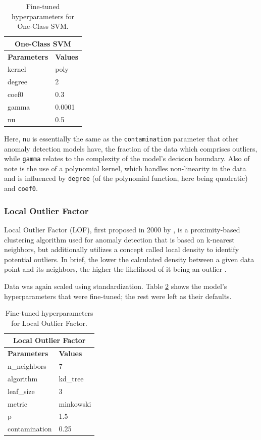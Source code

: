 \documentclass[12pt,a4paper]{article}
\numberwithin{figure}{section}
\numberwithin{table}{section}
\numberwithin{definition}{section}
\begin{document}
\begin{table}[!h] 
  \centering\small
  \renewcommand{\arraystretch}{1.5} 
  \begin{tabular}{@{}ll@{}}
  \hline
  \multicolumn{2}{|c|}{\textbf{One-Class SVM}} \\
  \hline
  \textbf{Parameters} & \textbf{Values} \\
  \hline
  kernel & poly \\
  degree & 2 \\
  coef0 & 0.3 \\
  gamma & 0.0001 \\
  nu & 0.5 \\
  \hline
  \end{tabular}
  \caption{Fine-tuned hyperparameters for One-Class SVM.}
  \label{tbl:oneclasssvmparams}
\end{table}

Here, \texttt{nu} is essentially the same as the \texttt{contamination} parameter that other anomaly detection models have, the fraction of the data which comprises outliers, while \texttt{gamma} relates to the complexity of the model's decision boundary. Also of note is the use of a polynomial kernel, which handles non-linearity in the data and is influenced by \texttt{degree} (of the polynomial function, here being quadratic) and \texttt{coef0}.

\subsubsection{Local Outlier Factor}
\label{ssec:localoutlierfactor}

Local Outlier Factor (LOF), first proposed in 2000 by \textcite{Breunig2000article}, is a proximity-based clustering algorithm used for anomaly detection that is based on k-nearest neighbors, but additionally utilizes a concept called local density to identify potential outliers. In brief, the lower the calculated density between a given data point and its neighbors, the higher the likelihood of it being an outlier \parencite{Cheng2019article}. 

Data was again scaled using standardization. Table \ref{tbl:lofparams} shows the model's hyperparameters that were fine-tuned; the rest were left as their defaults.

\begin{table}[!h] 
  \centering\small
  \renewcommand{\arraystretch}{1.5} 
  \begin{tabular}{@{}ll@{}}
  \hline
  \multicolumn{2}{|c|}{\textbf{Local Outlier Factor}} \\
  \hline
  \textbf{Parameters} & \textbf{Values} \\
  \hline
  n\_neighbors & 7 \\
  algorithm & kd\_tree \\
  leaf\_size & 3 \\
  metric & minkowski \\
  p & 1.5 \\
  contamination & 0.25 \\
  \hline
  \end{tabular}
  \caption{Fine-tuned hyperparameters for Local Outlier Factor.}
  \label{tbl:lofparams}
\end{table}
\end{document}
